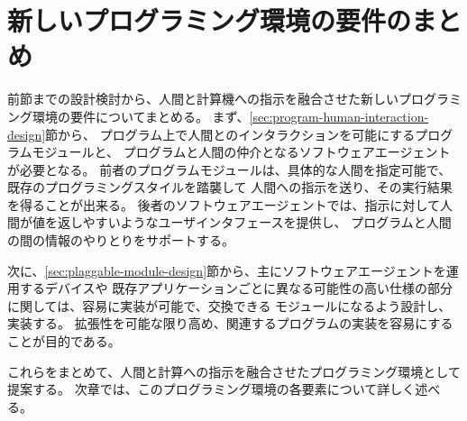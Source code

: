 \section{新しいプログラミング環境の要件のまとめ}\label{ux65b0ux3057ux3044ux30d7ux30edux30b0ux30e9ux30dfux30f3ux30b0ux74b0ux5883ux306eux8981ux4ef6ux306eux307eux3068ux3081}

前節までの設計検討から、人間と計算機への指示を融合させた新しいプログラミング環境の要件についてまとめる。
まず、\ref{sec:program-human-interaction-design}節から、
プログラム上で人間とのインタラクションを可能にするプログラムモジュールと、
プログラムと人間の仲介となるソフトウェアエージェントが必要となる。
前者のプログラムモジュールは、具体的な人間を指定可能で、既存のプログラミングスタイルを踏襲して
人間への指示を送り、その実行結果を得ることが出来る。
後者のソフトウェアエージェントでは、指示に対して人間が値を返しやすいようなユーザインタフェースを提供し、
プログラムと人間の間の情報のやりとりをサポートする。

次に、\ref{sec:plaggable-module-design}節から、主にソフトウェアエージェントを運用するデバイスや
既存アプリケーションごとに異なる可能性の高い仕様の部分に関しては、容易に実装が可能で、交換できる
モジュールになるよう設計し、実装する。
拡張性を可能な限り高め、関連するプログラムの実装を容易にすることが目的である。

これらをまとめて、人間と計算への指示を融合させたプログラミング環境として提案する。
次章では、このプログラミング環境の各要素について詳しく述べる。
